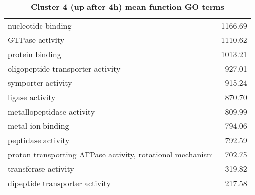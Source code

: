 \begin{table}[hp]
\begin{center}
\begin{tabular}{p{}r}
nucleotide binding                                                                             & 1166.69                     \\
GTPase activity                                                                                & 1110.62                     \\
protein binding                                                                                & 1013.21                     \\
oligopeptide transporter activity                                                              & 927.01                      \\
symporter activity                                                                             & 915.24                      \\
ligase activity                                                                                & 870.70                      \\
metallopeptidase activity                                                                      & 809.99                      \\
metal ion binding                                                                              & 794.06                      \\
peptidase activity                                                                             & 792.59                      \\
proton-transporting ATPase activity, rotational mechanism                                      & 702.75                      \\
transferase activity                                                                           & 319.82                      \\
dipeptide transporter activity                                                                 & 217.58                      \\ \bottomrule
\end{tabular}
\end{center}

\caption[Cluster 4 (up after 4h) mean function GO terms]{\sf \textbf{Cluster 4 (up after 4h) mean function GO terms}}
\label{tab:cls4-function}
\end{table}